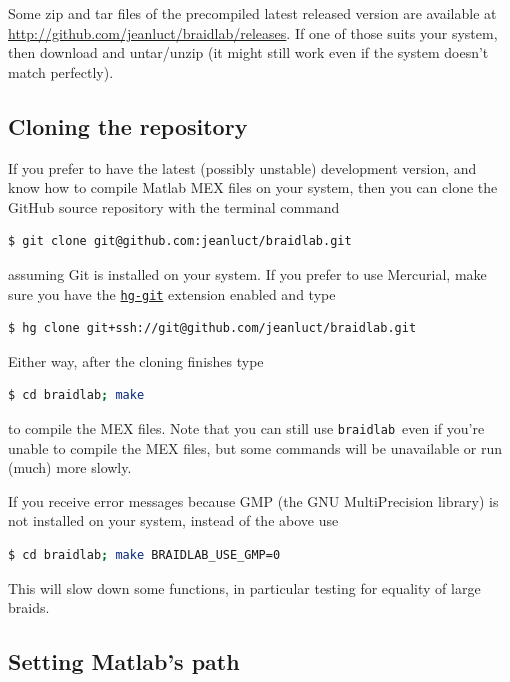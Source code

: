 \documentclass[12pt]{article}
\newcommand{\braidlab}{\texttt{braidlab}}%
\begin{document}
Some zip and tar files of the precompiled latest released version are
available at \url{http://github.com/jeanluct/braidlab/releases}.  If one of
those suits your system, then download and untar/unzip (it might still work
even if the system doesn't match perfectly).


\subsection{Cloning the repository}
\label{sec:cloning}

 If you prefer to have the latest (possibly unstable) development
version, and know how to compile Matlab MEX %
 files on your system, then you can clone the GitHub
source repository with the terminal command
\begin{lstlisting}[frame=single,framerule=0pt,escapechar=*,%
  language=bash,backgroundcolor=\color{white}]
$ git clone git@github.com:jeanluct/braidlab.git
\end{lstlisting}
assuming Git is installed on your system.  If you prefer to use
Mercurial, make sure you have the
\href{http://hg-git.github.io/}{\lstinline{hg-git}} extension enabled and type
\begin{lstlisting}[frame=single,framerule=0pt,escapechar=*,%
  language=bash,backgroundcolor=\color{white}]
$ hg clone git+ssh://git@github.com/jeanluct/braidlab.git
\end{lstlisting}
Either way, after the cloning finishes type
\begin{lstlisting}[frame=single,framerule=0pt,escapechar=*,%
  language=bash,backgroundcolor=\color{white}]
$ cd braidlab; make
\end{lstlisting}
to compile the MEX files.  Note that you can still use \braidlab\ even if
you're unable to compile the MEX files, but some commands will be unavailable
or run (much) more slowly.

 If you receive error messages because GMP (the GNU MultiPrecision
library) is not installed on your system, instead of the above use
\begin{lstlisting}[frame=single,framerule=0pt,escapechar=*,%
  language=bash,backgroundcolor=\color{white}]
$ cd braidlab; make BRAIDLAB_USE_GMP=0
\end{lstlisting}
This will slow down some functions, in particular testing for equality of
large braids.


\subsection{Setting Matlab's path}
\label{sec:path}
\end{document}

